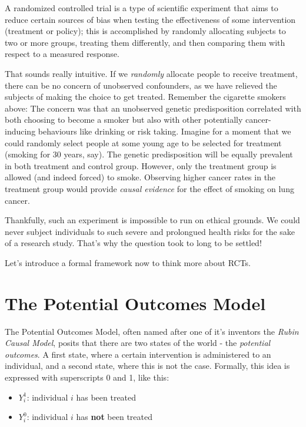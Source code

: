 \documentclass[]{book}
\providecommand{\tightlist}{%
  \setlength{\itemsep}{0pt}\setlength{\parskip}{0pt}}
\newenvironment{note}{\begin{tcolorbox}[colback=blue!5!white,colframe=blue!75!black]}{\end{tcolorbox}}
\begin{document}
\begin{note}
A randomized controlled trial is a type of scientific experiment that
aims to reduce certain sources of bias when testing the effectiveness of
some intervention (treatment or policy); this is accomplished by
randomly allocating subjects to two or more groups, treating them
differently, and then comparing them with respect to a measured
response.
\end{note}

 That sounds really intuitive. If we \emph{randomly} allocate people to
receive treatment, there can be no concern of unobserved confounders, as
we have relieved the subjects of making the choice to get treated.
Remember the cigarette smokers above: The concern was that an unobserved
genetic predisposition correlated with both choosing to become a smoker
but also with other potentially cancer-inducing behaviours like drinking
or risk taking. Imagine for a moment that we could randomly select
people at some young age to be selected for treatment (smoking for 30
years, say). The genetic predisposition will be equally prevalent in
both treatment and control group. However, only the treatment group is
allowed (and indeed forced) to smoke. Observing higher cancer rates in
the treatment group would provide \emph{causal evidence} for the effect
of smoking on lung cancer.

Thankfully, such an experiment is impossible to run on ethical grounds.
We could never subject individuals to such severe and prolongued health
risks for the sake of a research study. That's why the question took to
long to be settled!

Let's introduce a formal framework now to think more about RCTs.

\section{The Potential Outcomes Model}\label{rubin}

The Potential Outcomes Model, often named after one of it's inventors
the \emph{Rubin Causal Model}, posits that there are two states of the
world - the \emph{potential outcomes}. A first state, where a certain
intervention is administered to an individual, and a second state, where
this is not the case. Formally, this idea is expressed with superscripts
0 and 1, like this:

\begin{itemize}
\tightlist
\item
  \(Y_i^1\): individual \(i\) has been treated
\item
  \(Y_i^0\): individual \(i\) has \textbf{not} been treated
\end{itemize}
\end{document}
